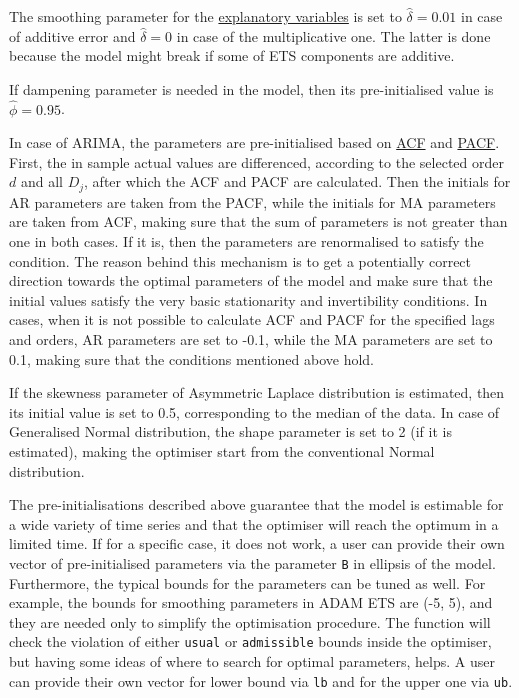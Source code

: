 \documentclass[
]{book}
\theoremstyle{definition}
\theoremstyle{definition}
\theoremstyle{definition}
\theoremstyle{definition}
\theoremstyle{remark}
\begin{document}
The smoothing parameter for the \protect\hyperlink{ETSXDynamic}{explanatory variables} is set to \(\hat{\delta}=0.01\) in case of additive error and \(\hat{\delta}=0\) in case of the multiplicative one. The latter is done because the model might break if some of ETS components are additive.

If dampening parameter is needed in the model, then its pre-initialised value is \(\hat{\phi}=0.95\).

In case of ARIMA, the parameters are pre-initialised based on \protect\hyperlink{ACF}{ACF} and \protect\hyperlink{PACF}{PACF}. First, the in sample actual values are differenced, according to the selected order \(d\) and all \(D_j\), after which the ACF and PACF are calculated. Then the initials for AR parameters are taken from the PACF, while the initials for MA parameters are taken from ACF, making sure that the sum of parameters is not greater than one in both cases. If it is, then the parameters are renormalised to satisfy the condition. The reason behind this mechanism is to get a potentially correct direction towards the optimal parameters of the model and make sure that the initial values satisfy the very basic stationarity and invertibility conditions. In cases, when it is not possible to calculate ACF and PACF for the specified lags and orders, AR parameters are set to -0.1, while the MA parameters are set to 0.1, making sure that the conditions mentioned above hold.

If the skewness parameter of Asymmetric Laplace distribution is estimated, then its initial value is set to 0.5, corresponding to the median of the data. In case of Generalised Normal distribution, the shape parameter is set to 2 (if it is estimated), making the optimiser start from the conventional Normal distribution.

The pre-initialisations described above guarantee that the model is estimable for a wide variety of time series and that the optimiser will reach the optimum in a limited time. If for a specific case, it does not work, a user can provide their own vector of pre-initialised parameters via the parameter \texttt{B} in ellipsis of the model. Furthermore, the typical bounds for the parameters can be tuned as well. For example, the bounds for smoothing parameters in ADAM ETS are (-5, 5), and they are needed only to simplify the optimisation procedure. The function will check the violation of either \texttt{usual} or \texttt{admissible} bounds inside the optimiser, but having some ideas of where to search for optimal parameters, helps. A user can provide their own vector for lower bound via \texttt{lb} and for the upper one via \texttt{ub}.
\end{document}
